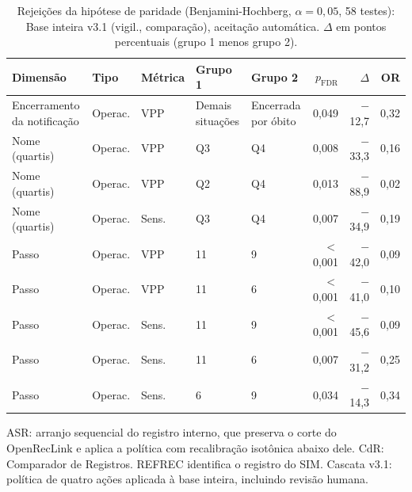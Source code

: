 \begin{table}[htbp]
\centering
\caption{Rejei\c{c}\~oes da hip\'otese de paridade (Benjamini-Hochberg, $\alpha = 0{,}05$, 58 testes): Base inteira v3.1 (vigil., comparação), aceitação automática. $\Delta$ em pontos percentuais (grupo 1 menos grupo 2).}
\label{tab:equidade-arranjo-rejeicoes-cascata-v31-vigilancia}
\footnotesize\setlength{\tabcolsep}{3pt}
\begin{tabular}{lllllrrr}
\toprule
Dimens\~ao & Tipo & M\'etrica & Grupo 1 & Grupo 2 & $p_{\mathrm{FDR}}$ & $\Delta$ & OR \\
\midrule
Encerramento da notifica\c{c}\~ao & Operac. & VPP & Demais situa\c{c}\~oes & Encerrada por \'obito & 0{,}049 & $-$12{,}7 & 0{,}32 \\
Nome (quartis) & Operac. & VPP & Q3 & Q4 & 0{,}008 & $-$33{,}3 & 0{,}16 \\
Nome (quartis) & Operac. & VPP & Q2 & Q4 & 0{,}013 & $-$88{,}9 & 0{,}02 \\
Nome (quartis) & Operac. & Sens. & Q3 & Q4 & 0{,}007 & $-$34{,}9 & 0{,}19 \\
Passo & Operac. & VPP & 11 & 9 & $<$0{,}001 & $-$42{,}0 & 0{,}09 \\
Passo & Operac. & VPP & 11 & 6 & $<$0{,}001 & $-$41{,}0 & 0{,}10 \\
Passo & Operac. & Sens. & 11 & 9 & $<$0{,}001 & $-$45{,}6 & 0{,}09 \\
Passo & Operac. & Sens. & 11 & 6 & 0{,}007 & $-$31{,}2 & 0{,}25 \\
Passo & Operac. & Sens. & 6 & 9 & 0{,}034 & $-$14{,}3 & 0{,}34 \\
\bottomrule
\end{tabular}
\par{}\par\footnotesize ASR: arranjo sequencial do registro interno, que preserva o corte do OpenRecLink e aplica a política com recalibração isotônica abaixo dele. CdR: Comparador de Registros. REFREC identifica o registro do SIM. Cascata v3.1: política de quatro ações aplicada à base inteira, incluindo revisão humana.
\end{table}
